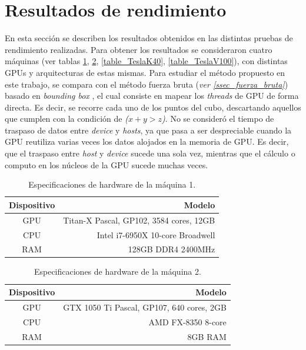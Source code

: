 \documentclass[10pt, conference, compsocconf, onecolumn]{IEEEtran}
\begin{document}
\section{Resultados de rendimiento}
\label{sec_resultado}
En esta secci\'on se describen los resultados obtenidos en las distintas pruebas de rendimiento realizadas. Para obtener los resultados se consideraron cuatro m\'aquinas (ver tablas \ref{table_titanx}, \ref{table_gtx1050}, \ref{table_TeslaK40}, \ref{table_TeslaV100}), con distintas GPUs y arquitecturas de estas mismas. Para estudiar el m\'etodo propuesto en este trabajo, se compara con el m\'etodo fuerza bruta (\textit{ver \ref{ssec_fuerza_bruta}}) basado en \textit{bounding box} \cite{PossiRec2016}, el cual consiste en mapear los \textit{threads} de GPU de forma directa. Es decir, se recorre cada uno de los puntos del cubo, descartando aquellos que cumplen con la condici\'on de \textit{($x+y > z$)}. No se consider\'o el tiempo de traspaso de datos entre \textit{device} y \textit{hosts}, ya que pasa a ser despreciable cuando la GPU reutiliza varias veces los datos alojados en la memoria de GPU. Es decir, que el traspaso entre \textit{host} y \textit{device} sucede una sola vez, mientras que el c\'alculo o computo en los n\'ucleos de la GPU sucede muchas veces.



 \begin{table}[H]
	\normalsize
	\caption{Especificaciones de hardware de la m\'aquina 1.}
	\begin{center}
		\begin{tabular}{|c|r|}
			\hline
			Dispositivo	&	Modelo\\
			\hline
			GPU	&	Titan-X Pascal, GP102, 3584 cores, 12GB\\
			CPU	&	Intel i7-6950X 10-core Broadwell\\
			RAM	&	128GB DDR4 2400MHz\\
			\hline
		\end{tabular}
	\end{center}
	\label{table_titanx}
\end{table}

\begin{table}[H]
	\normalsize
	\caption{Especificaciones de hardware de la m\'aquina 2.}
	\begin{center}
		\begin{tabular}{|c|r|}
			\hline
			Dispositivo	&	Modelo\\
			\hline
			GPU	&	GTX 1050 Ti Pascal, GP107, 640 cores, 2GB\\
			CPU	&	AMD FX-8350 8-core\\
			RAM	&	8GB RAM\\
			\hline
		\end{tabular}
	\end{center}
	\label{table_gtx1050}
\end{table}
\end{document}
